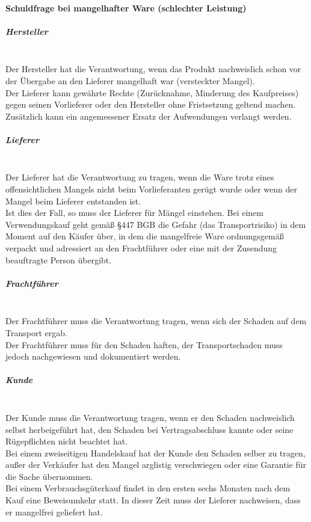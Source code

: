 	\paragraph{Schuldfrage bei mangelhafter Ware (schlechter Leistung)} 
		\subparagraph{Hersteller}~\\Der Hersteller hat die Verantwortung, wenn das Produkt nachweislich schon vor der Übergabe an den Lieferer mangelhaft war (versteckter Mangel).\\
	Der Lieferer kann gewährte Rechte (Zurücknahme, Minderung des Kaufpreises) gegen seinen Vorlieferer oder den Hersteller ohne Fristsetzung geltend machen. Zusätzlich kann ein angemessener Ersatz der Aufwendungen verlangt werden.
		\subparagraph{Lieferer}~\\ Der Lieferer hat die Verantwortung zu tragen, wenn die Ware trotz eines offensichtlichen Mangels nicht beim Vorlieferanten gerügt wurde oder wenn der Mangel beim Lieferer entstanden ist.\\
		Ist dies der Fall, so muss der Lieferer für Mängel einstehen. Bei einem Verwendungskauf geht gemäß §447 BGB die Gefahr (das Transportrisiko) in dem Moment auf den Käufer über, in dem die mangelfreie Ware ordnungsgemäß verpackt und adressiert an den Frachtführer oder eine mit der Zusendung beauftragte Person übergibt.
		\subparagraph{Frachtführer}~\\Der Frachtführer muss die Verantwortung tragen, wenn sich der Schaden auf dem Transport ergab.\\
		Der Frachtführer muss für den Schaden haften, der Transportschaden muss jedoch nachgewiesen und dokumentiert werden.
		\subparagraph{Kunde}~\\Der Kunde muss die Verantwortung tragen, wenn er den Schaden nachweislich selbst herbeigeführt hat, den Schaden bei Vertragsabschluss kannte oder seine Rügepflichten nicht beachtet hat.\\
		Bei einem zweiseitigen Handelskauf hat der Kunde den Schaden selber zu tragen, außer der Verkäufer hat den Mangel arglistig verschwiegen oder eine Garantie für die Sache übernommen. \\
		Bei einem Verbrauchsgüterkauf findet in den ersten sechs Monaten nach dem Kauf eine Beweisumkehr statt. In dieser Zeit muss der Lieferer nachweisen, dass er mangelfrei geliefert hat.
		

